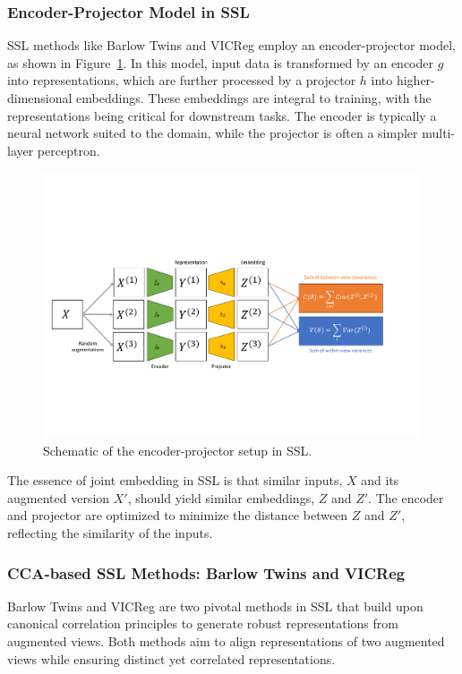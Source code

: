 \subsubsection{Encoder-Projector Model in SSL}
SSL methods like Barlow Twins and VICReg employ an encoder-projector model, as shown in Figure~\ref{fig:sslschematic}. In this model, input data is transformed by an encoder \( g \) into representations, which are further processed by a projector \( h \) into higher-dimensional embeddings. These embeddings are integral to training, with the representations being critical for downstream tasks. The encoder is typically a neural network suited to the domain, while the projector is often a simpler multi-layer perceptron.

\begin{figure}[ht]
    \centering
    \includegraphics[width=0.99\textwidth]{figures/ssl_schematic}
    \caption{Schematic of the encoder-projector setup in SSL.}
    \label{fig:sslschematic}
\end{figure}

The essence of joint embedding in SSL is that similar inputs, \( X \) and its augmented version \( X' \), should yield similar embeddings, \( Z \) and \( Z' \).
The encoder and projector are optimized to minimize the distance between \( Z \) and \( Z' \), reflecting the similarity of the inputs.

\subsubsection{CCA-based SSL Methods: Barlow Twins and VICReg}
Barlow Twins and VICReg are two pivotal methods in SSL that build upon canonical correlation principles to generate robust representations from augmented views.
Both methods aim to align representations of two augmented views while ensuring distinct yet correlated representations.

